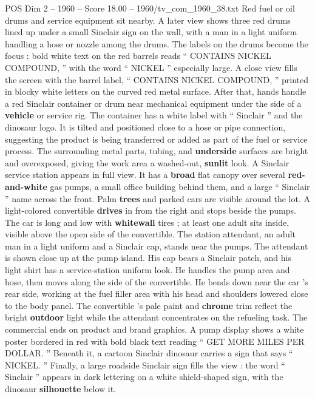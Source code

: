 \begin{textsample}{POS Dim 2 – 1960 – Score 18.00 – 1960/tv\_com\_1960\_38.txt}
Red fuel or oil drums and service equipment sit nearby.
A later view shows three red drums lined up under a small Sinclair sign on the wall, with a man in a light uniform handling a hose or nozzle among the drums.
The labels on the drums become the focus : bold white text on the red barrels reads “ CONTAINS NICKEL COMPOUND, ” with the word “ NICKEL ” especially large.
A close view fills the screen with the barrel label, “ CONTAINS NICKEL COMPOUND, ” printed in blocky white letters on the curved red metal surface.
After that, hands handle a red Sinclair container or drum near mechanical equipment under the side of a \textbf{vehicle} or service rig.
The container has a white label with “ Sinclair ” and the dinosaur logo.
It is tilted and positioned close to a hose or pipe connection, suggesting the product is being transferred or added as part of the fuel or service process.
The surrounding metal parts, tubing, and \textbf{underside} surfaces are bright and overexposed, giving the work area a washed-out, \textbf{sunlit} look.
A Sinclair service station appears in full view.
It has a \textbf{broad} flat canopy over several \textbf{red-and-white} gas pumps, a small office building behind them, and a large “ Sinclair ” name across the front.
Palm \textbf{trees} and parked cars are visible around the lot.
A light-colored convertible \textbf{drives} in from the right and stops beside the pumps.
The car is long and low with \textbf{whitewall} tires ; at least one adult sits inside, visible above the open side of the convertible.
The station attendant, an adult man in a light uniform and a Sinclair cap, stands near the pumps.
The attendant is shown close up at the pump island.
His cap bears a Sinclair patch, and his light shirt has a service-station uniform look.
He handles the pump area and hose, then moves along the side of the convertible.
He bends down near the car ’s rear side, working at the fuel filler area with his head and shoulders lowered close to the body panel.
The convertible ’s pale paint and \textbf{chrome} trim reflect the bright \textbf{outdoor} light while the attendant concentrates on the refueling task.
The commercial ends on product and brand graphics.
A pump display shows a white poster bordered in red with bold black text reading “ GET MORE MILES PER DOLLAR. ” Beneath it, a cartoon Sinclair dinosaur carries a sign that says “ NICKEL. ” Finally, a large roadside Sinclair sign fills the view : the word “ Sinclair ” appears in dark lettering on a white shield-shaped sign, with the dinosaur \textbf{silhouette} below it.

\end{textsample}
